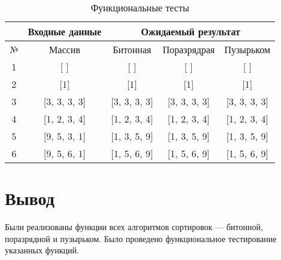 \begin{table}[h]
	\begin{center}
		\begin{threeparttable}
			\captionsetup{justification=raggedright,singlelinecheck=off}
			\caption{\label{tbl:tests} Функциональные тесты}
			\begin{tabular}{|c|c|c|c|c|}
				\hline
				&Входные данные& \multicolumn{3}{c|}{Ожидаемый результат} \\
				\hline
				№&Массив&Битонная&Поразрядрая&Пузырьком \\
				\hline
				1&[ ]&[ ]&[ ]&[ ] \\
				\hline
				2&[1]&[1]&[1]&[1] \\
				\hline
				3&[3, 3, 3, 3]&[3, 3, 3, 3]&[3, 3, 3, 3]&[3, 3, 3, 3] \\
				\hline
				4&[1, 2, 3, 4]&[1, 2, 3, 4]&[1, 2, 3, 4]&[1, 2, 3, 4] \\
				\hline
				5&[9, 5, 3, 1]&[1, 3, 5, 9]&[1, 3, 5, 9]&[1, 3, 5, 9] \\
				\hline
				6&[9, 5, 6, 1]&[1, 5, 6, 9]&[1, 5, 6, 9]&[1, 5, 6, 9] \\
				\hline
			\end{tabular}
		\end{threeparttable}
	\end{center}
\end{table}


\section{Вывод}

Были реализованы функции всех алгоритмов сортировок — битонной, поразрядной и пузырьком.
Было проведено функциональное тестирование указанных функций.